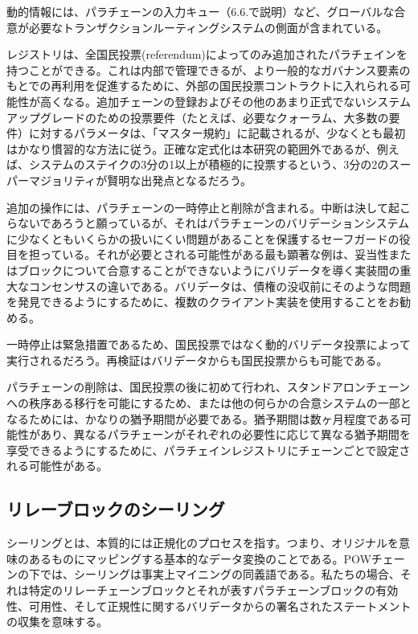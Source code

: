 動的情報には、パラチェーンの入力キュー（6.6.で説明）など、グローバルな合意が必要なトランザクションルーティングシステムの側面が含まれている。

レジストリは、全国民投票(referendum)によってのみ追加されたパラチェインを持つことができる。これは内部で管理できるが、より一般的なガバナンス要素のもとでの再利用を促進するために、外部の国民投票コントラクトに入れられる可能性が高くなる。追加チェーンの登録およびその他のあまり正式でないシステムアップグレードのための投票要件（たとえば、必要なクォーラム、大多数の要件）に対するパラメータは、「マスター規約」に記載されるが、少なくとも最初はかなり慣習的な方法に従う。正確な定式化は本研究の範囲外であるが、例えば、システムのステイクの3分の1以上が積極的に投票するという、3分の2のスーパーマジョリティが賢明な出発点となるだろう。

追加の操作には、パラチェーンの一時停止と削除が含まれる。中断は決して起こらないであろうと願っているが、それはパラチェーンのバリデーションシステムに少なくともいくらかの扱いにくい問題があることを保護するセーフガードの役目を担っている。それが必要とされる可能性がある最も顕著な例は、妥当性またはブロックについて合意することができないようにバリデータを導く実装間の重大なコンセンサスの違いである。バリデータは、債権の没収前にそのような問題を発見できるようにするために、複数のクライアント実装を使用することをお勧める。

一時停止は緊急措置であるため、国民投票ではなく動的バリデータ投票によって実行されるだろう。再検証はバリデータからも国民投票からも可能である。

パラチェーンの削除は、国民投票の後に初めて行われ、スタンドアロンチェーンへの秩序ある移行を可能にするため、または他の何らかの合意システムの一部となるためには、かなりの猶予期間が必要である。猶予期間は数ヶ月程度である可能性があり、異なるパラチェーンがそれぞれの必要性に応じて異なる猶予期間を享受できるようにするために、パラチェインレジストリにチェーンごとで設定される可能性がある。

\hypertarget{ux30eaux30ecux30fcux30d6ux30edux30c3ux30afux306eux30b7ux30fcux30eaux30f3ux30b0}{%
\subsection{リレーブロックのシーリング}\label{ux30eaux30ecux30fcux30d6ux30edux30c3ux30afux306eux30b7ux30fcux30eaux30f3ux30b0}}

シーリングとは、本質的には正規化のプロセスを指す。つまり、オリジナルを意味のあるものにマッピングする基本的なデータ変換のことである。POWチェーンの下では、シーリングは事実上マイニングの同義語である。私たちの場合、それは特定のリレーチェーンブロックとそれが表すパラチェーンブロックの有効性、可用性、そして正規性に関するバリデータからの署名されたステートメントの収集を意味する。

